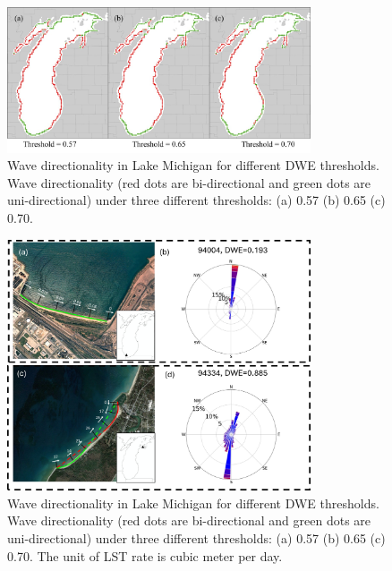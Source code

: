 \begin{figure}[htbp]
  \centering
  \includegraphics[width=0.8\textwidth]{appendix/resources/figure3-2a.jpg}
  \caption{Wave directionality in Lake Michigan for different DWE thresholds. Wave directionality (red dots are bi-directional and green dots are uni-directional) under three different thresholds: (a) 0.57 (b) 0.65 (c) 0.70.}
  \label{fig:fig3.2a}
\end{figure}

\begin{figure}[htbp]
  \centering
  \includegraphics[width=0.8\textwidth]{appendix/resources/figure3-3a.jpg}
  \caption{Wave directionality in Lake Michigan for different DWE thresholds. Wave directionality (red dots are bi-directional and green dots are uni-directional) under three different thresholds: (a) 0.57 (b) 0.65 (c) 0.70. The unit of LST rate is cubic meter per day.}
  \label{fig:fig3.3a}
\end{figure}



